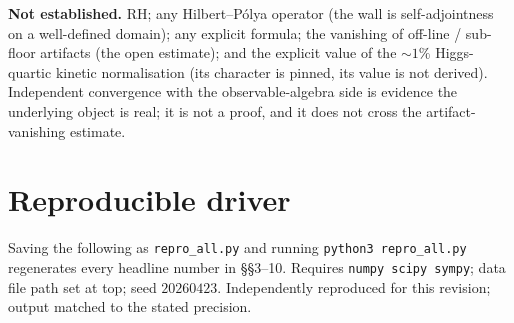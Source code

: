 \documentclass[11pt]{article}
\begin{document}
\textbf{Not established.} RH; any Hilbert--P\'olya operator (the wall is self-adjointness on a well-defined domain); any explicit formula; the vanishing of off-line / sub-floor artifacts (the open estimate); and the explicit value of the $\sim1\%$ Higgs-quartic kinetic normalisation (its character is pinned, its value is not derived). Independent convergence with the observable-algebra side is evidence the underlying object is real; it is not a proof, and it does not cross the artifact-vanishing estimate.

\appendix

\section{Reproducible driver}
Saving the following as \texttt{repro\_all.py} and running \texttt{python3 repro\_all.py} regenerates every headline number in \S\S3--10. Requires \texttt{numpy scipy sympy}; data file path set at top; seed $20260423$. Independently reproduced for this revision; output matched to the stated precision.
\end{document}
